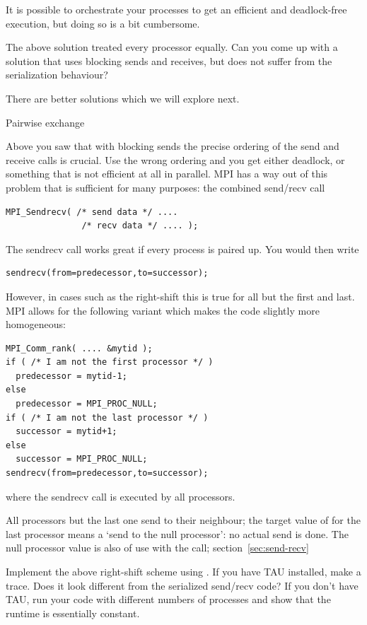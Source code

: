 It is possible to orchestrate your processes to get an efficient and
deadlock-free execution, but doing so is a bit cumbersome.

\begin{exercise}
  The above solution treated every processor equally. Can you come up
  with a solution that uses blocking sends and receives, but does not
  suffer from the serialization behaviour?
\end{exercise}

There are better solutions which we will
explore next.


 {Pairwise exchange}

Above you saw that with blocking sends the precise ordering of the
send and receive calls is crucial. Use the wrong ordering and you get
either deadlock, or something that is not efficient at all in
parallel. MPI has a way out of this problem that is sufficient for
many purposes: the combined send/recv call
\begin{verbatim}
MPI_Sendrecv( /* send data */ ....
               /* recv data */ .... );
\end{verbatim}

The sendrecv call works great if every process is paired up.
You would then write
\begin{verbatim}
sendrecv(from=predecessor,to=successor);
\end{verbatim}
However, in cases such as the right-shift this is true for all but
the first and last. 
MPI allows for the following variant which makes the code slightly 
more homogeneous:
\begin{verbatim}
MPI_Comm_rank( .... &mytid );
if ( /* I am not the first processor */ )
  predecessor = mytid-1;
else
  predecessor = MPI_PROC_NULL;
if ( /* I am not the last processor */ )
  successor = mytid+1;
else
  successor = MPI_PROC_NULL;
sendrecv(from=predecessor,to=successor);
\end{verbatim}
where the sendrecv call is executed by all processors.

All processors but the last one send to their neighbour; the target value
of  for the last processor
means a `send to the null processor':  no actual send is done. 
The null processor
value is also of use with the  call;
section~\ref{sec:send-recv}

\begin{exercise}
  \label{ex:3ptsendrecv}
  Implement the above right-shift scheme using .
  If you have TAU installed, make a trace. Does it look different
  from the serialized send/recv code? If you don't have TAU, run your
  code with different numbers of processes and show that the runtime
  is essentially constant.
\end{exercise}

